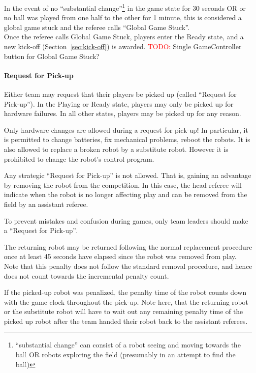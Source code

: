 In the event of no ``substantial change''\footnote{``substantial change'' can consist of a robot seeing and moving towards the ball OR robots exploring the field (presumably in an attempt to find the ball)} in the game state for 30 seconds OR or no ball was played from one half to the other for 1 minute, this is considered a global game stuck and the referee calls ``Global Game Stuck''. \\
Once the referee calls Global Game Stuck, players enter the Ready state, and a new kick-off (\cf Section~\ref{sec:kick-off}) is awarded.
\textcolor{red}{TODO:} Single GameController button for Global Game Stuck?


\paragraph{Request for Pick-up}
\label{sec:request_for_pickup}

Either team may request that their players be picked up (called ``Request for Pick-up'').
In the Playing or Ready state, players may only be picked up for hardware failures.
In all other states, players may be picked up for any reason.

Only hardware changes are allowed during a request for pick-up! In particular,
it is permitted to change batteries, fix mechanical problems, reboot the robots.
It is also allowed to replace a broken robot by a substitute robot.
However it is prohibited to change the robot's control program.

Any strategic ``Request for Pick-up'' is not allowed.
That is, gaining an advantage by removing the robot from the competition.
In this case, the head referee will indicate when the robot is no longer affecting play and can be removed from the field by an assistant referee.

To prevent mistakes and confusion during games, only team leaders should make a ``Request for Pick-up''.

The returning robot may be returned following the normal replacement procedure once at least 45 seconds have elapsed since the robot was removed from play. Note that this penalty does not follow the standard removal procedure, and hence does not count towards the incremental penalty count.

If the picked-up robot was penalized, the penalty time of the robot counts down with the game clock throughout the pick-up.
Note here, that the returning robot or the substitute robot will have to wait out any remaining penalty time of the picked up robot after the team handed their robot back to the assistant referees.

